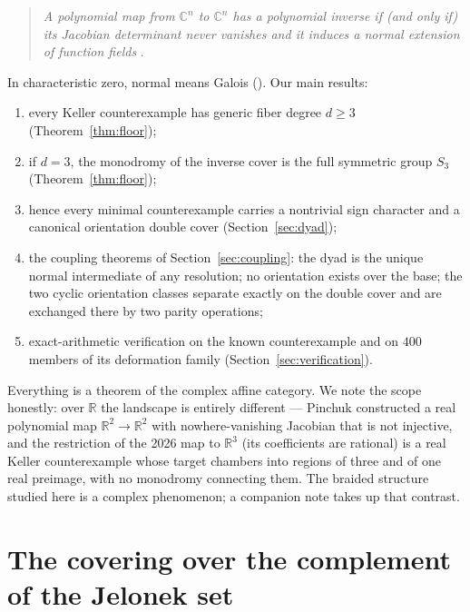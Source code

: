 \documentclass[11pt,reqno]{amsart}
\numberwithin{equation}{section}
\theoremstyle{remark}
\newcommand{\C}{\mathbb C}
\newcommand{\R}{\mathbb R}
\begin{document}
\begin{quote}
\emph{A polynomial map from $\C^n$ to $\C^n$ has a polynomial inverse if
(and only if) its Jacobian determinant never vanishes and it induces a
normal extension of function fields} \cite[p.~244]{Campbell}.
\end{quote}

\noindent In characteristic zero, normal means Galois
(\cite[Lemma~1]{Campbell}). Our main results:

\begin{enumerate}[label=\textup{(\Alph*)}]
\item every Keller counterexample has generic fiber degree $d\ge3$
(Theorem~\ref{thm:floor});
\item if $d=3$, the monodromy of the inverse cover is the full symmetric
group $S_3$ (Theorem~\ref{thm:floor});
\item hence every minimal counterexample carries a nontrivial sign
character and a canonical orientation double cover
(Section~\ref{sec:dyad});
\item the coupling theorems of Section~\ref{sec:coupling}: the dyad is the
unique normal intermediate of any resolution; no orientation exists over
the base; the two cyclic orientation classes separate exactly on the double
cover and are exchanged there by two parity operations;
\item exact-arithmetic verification on the known counterexample and on
$400$ members of its deformation family (Section~\ref{sec:verification}).
\end{enumerate}

Everything is a theorem of the complex affine category. We note the scope
honestly: over $\R$ the landscape is entirely different --- Pinchuk
\cite{Pinchuk} constructed a real polynomial map $\R^2\to\R^2$ with
nowhere-vanishing Jacobian that is not injective, and the restriction of
the 2026 map to $\R^3$ (its coefficients are rational) is a real Keller
counterexample whose target chambers into regions of three and of one real
preimage, with no monodromy connecting them. The braided structure studied
here is a complex phenomenon; a companion note takes up that contrast.

\section{The covering over the complement of the Jelonek
set}\label{sec:setting}
\end{document}

